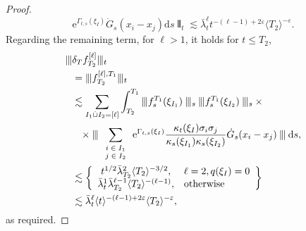 \documentclass[11pt, a4paper]{scrartcl}
\numberwithin{equation}{section}
\theoremstyle{plain}
\theoremstyle{remark}
\newcommand{\mathd}{\mathrm{d}}
\newcommand{\mathe}{\mathrm{e}}
\newcommand{\tmscript}[1]{\text{\scriptsize{$#1$}}}
\begin{document}
\begin{proof}
\[		\mathe^{\Gamma_{t, s} (\xi_I)} \dot{G}_s (x_i - x_j) \mathd s \interleave_t
		\lesssim \bar{\lambda}_t^{\ell} t^{- (\ell - 1) + 2 \varepsilon} \langle T_2
		\rangle^{- \varepsilon} . \]
	Regarding the remaining term, for $\ell > 1$, it holds for $t \leqslant T_2$,
	\begin{equation*}
		\begin{aligned}
			\interleave & \delta_T f_{T_2}^{[\ell]} \interleave_t                                                                                          \\
			            & = \interleave
			f_{T_2}^{[\ell], T_1} \interleave_t                                                                                                            \\
			            & \lesssim \sum_{I_1 \dot{\cup} I_2 = [\ell]} \int_{T_2}^{T_1} \interleave
			f_s^{T_1} (\xi_{I_1}) \interleave_s \interleave f_s^{T_1} (\xi_{I_2})
			\interleave_s \times                                                                                                                           \\
			            & \phantom{\lesssim}\times\interleave \sum_{\tmscript{\begin{array}{c}
						                                                                  i \in I_1 \\
						                                                                  j \in I_2
					                                                                  \end{array}}} \mathe^{\Gamma_{t, s} (\xi_I)} \frac{\kappa_t (\xi_I) \sigma_i
				\sigma_j}{\kappa_s (\xi_{I_1}) \kappa_s (\xi_{I_2})} \dot{G}_s (x_i - x_j)
			\interleave \mathd s,                                                                                                                          \\
			            & \lesssim \left\{ \begin{array}{cl}
				                               t^{1 / 2} \bar{\lambda}_{T_2}^2 \langle T_2 \rangle^{- 3 / 2}, & \ell = 2, q
				                               (\xi_I) = 0                                                                       \\
				                               \bar{\lambda}_t^1 \bar{\lambda}_{T_2}^{\ell - 1} \langle T_2 \rangle^{- (\ell -
				                               1)},                                                           & \text{otherwise}
			                               \end{array} \right\}                               \\
			            & \lesssim \bar{\lambda}_t^{\ell} \langle t \rangle^{- (\ell
				- 1) + 2 \varepsilon} \langle T_2 \rangle^{- \varepsilon},
		\end{aligned}
	\end{equation*}
	as required.
\end{proof}
\end{document}
